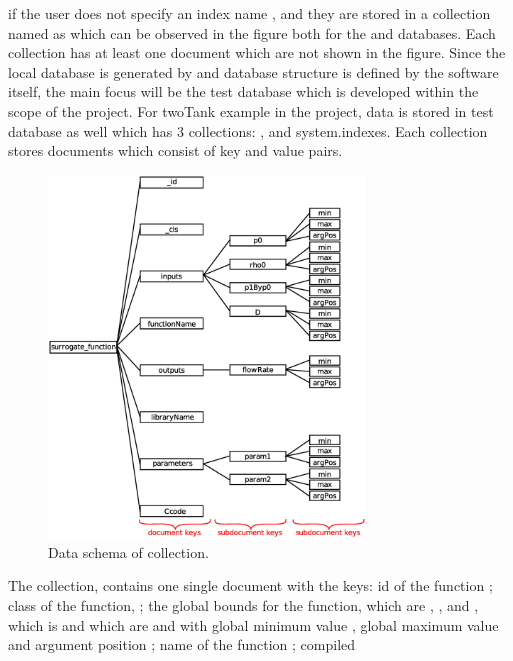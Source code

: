 if the user does not specify an index name \cite{MongoDBManual}, and they are
stored in a collection named as {\sysIndex} which can be observed in the figure
both for the {\tst} and {\fireworks} databases.  Each collection has at least one
document which are not shown in the figure.
%
Since the local database is generated by {\MongoDB} and {\fireworks} database structure
is defined by the software itself, the main focus will be the test database
which is developed within the scope of the {\MoDeNa} project.  For twoTank
example in the project, data is stored in test database as well which has 3
collections: {\surrogateFunction}, {\surrogateModel} and system.indexes.  Each
collection stores documents which consist of key and value pairs.
%
\begin{figure}
  \centering
  \includegraphics[width=0.75\textwidth,keepaspectratio=true]{./Content/Figures/surrogate_function.eps}
  \caption{Data schema of {\surrogateFunction} collection.}
  \label{fig:surrogatefunction}
\end{figure}
%
The collection, {\surrogateFunction} contains one single document with the keys:
id of the function \id; class of the function, {\cls}; the global bounds for the
function, {} which are {\pZero}, {\rhoZero}, {\pOneByPzero} and
{\diameter}, {\outputs} which is {\flowRate} and {\params} which are {\paramOne}
and {\paramTwo} with global minimum value {\Min}, global maximum value {\Max}
and argument position {\argPos}; name of the function {\functionName}; compiled
